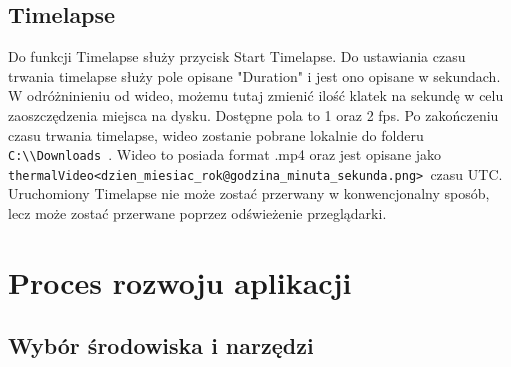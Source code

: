 \documentclass[a4paper,twoside,12pt]{book}
\begin{document}
\section{Timelapse}
Do funkcji Timelapse służy przycisk Start Timelapse. Do ustawiania czasu trwania timelapse służy pole opisane "Duration" i jest ono opisane w sekundach. W odróżninieniu od wideo, możemu tutaj zmienić ilość klatek na sekundę w celu zaoszczędzenia miejsca na dysku. Dostępne pola to 1 oraz 2 fps. Po zakończeniu czasu trwania timelapse, wideo zostanie pobrane lokalnie do folderu \lstinline|C:\\Downloads |. Wideo to posiada format .mp4 oraz jest opisane jako \lstinline|thermalVideo<dzien_miesiac_rok@godzina_minuta_sekunda.png> |czasu UTC. Uruchomiony Timelapse nie może zostać przerwany w konwencjonalny sposób, lecz może zostać przerwane poprzez odświeżenie przeglądarki.

\chapter{Proces rozwoju aplikacji}
\label{proces-rozwoju-aplikacji}
\section{Wybór środowiska i narzędzi}
\end{document}
